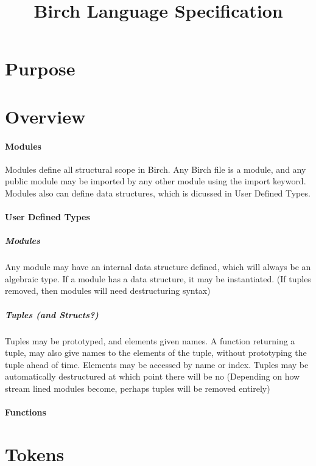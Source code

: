 \documentclass{article}
\title{Birch Language Specification}
\begin{document}
	\maketitle
	\newpage
	\section{Purpose}
	\section{Overview}
		\paragraph{Modules}
			Modules define all structural scope in Birch. 
			Any Birch file is a module, and any public module may be imported by any other module using the import keyword.
			Modules also can define data structures, which is dicussed in User Defined Types.
		\paragraph{User Defined Types}
			\subparagraph{Modules}
				Any module may have an internal data structure defined, which will always be an algebraic type.
				If a module has a data structure, it may be instantiated.
				(If tuples removed, then modules will need destructuring syntax)
			\subparagraph{Tuples (and Structs?)}
				Tuples may be prototyped, and elements given names. 
				A function returning a tuple, may also give names to the elements of the tuple, without prototyping the tuple ahead of time.
				Elements may be accessed by name or index.
				Tuples may be automatically destructured at which point there will be no
				(Depending on how stream lined modules become, perhaps tuples will be removed entirely)
		\paragraph{Functions}
	\section{Tokens}
\end{document}
